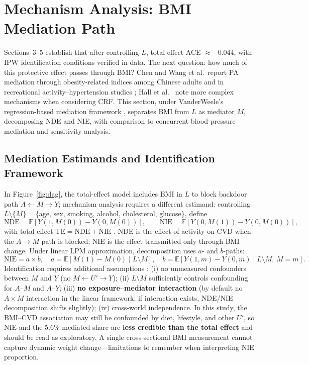 \documentclass[12pt,a4paper]{article}
\newcommand{\E}{\mathbb{E}}
\begin{document}
\section{Mechanism Analysis: BMI Mediation Path}

Sections~3--5 establish that after controlling $L$, total effect ACE $\approx -0.044$, with IPW identification conditions verified in data. The next question: how much of this protective effect passes through BMI? Chen and Wang et al.\ report PA mediation through obesity-related indices among Chinese adults and in recreational activity--hypertension studies \cite{chen2023pa,wang2023obesity}; Hall et al.\ \cite{bjsports2023crf} note more complex mechanisms when considering CRF. This section, under VanderWeele's regression-based mediation framework \cite{vanderweele2015explanation}, separates BMI from $L$ as mediator $M$, decomposing NDE and NIE, with comparison to concurrent blood pressure mediation and sensitivity analysis.

\subsection{Mediation Estimands and Identification Framework}

In Figure~\ref{fig:dag}, the total-effect model includes BMI in $L$ to block backdoor path $A\leftarrow M\to Y$; mechanism analysis requires a different estimand: controlling $L\setminus\{M\}=\{$age, sex, smoking, alcohol, cholesterol, glucose$\}$, define
\[
\mathrm{NDE}=\E[Y(1,M(0))-Y(0,M(0))],\qquad
\mathrm{NIE}=\E[Y(0,M(1))-Y(0,M(0))],
\]
with total effect $\mathrm{TE}=\mathrm{NDE}+\mathrm{NIE}$ \cite{vanderweele2015explanation}. NDE is the effect of activity on CVD when the $A\to M$ path is blocked; NIE is the effect transmitted only through BMI change. Under linear LPM approximation, decomposition uses $a$- and $b$-paths:
\[
\mathrm{NIE}=a\times b,\quad
a=\E[M(1)-M(0)\mid L\setminus M],\quad
b=\E[Y(1,m)-Y(0,m)\mid L\setminus M,\,M=m].
\]
Identification requires additional assumptions \cite{vanderweele2015explanation}: (i) no unmeasured confounders between $M$ and $Y$ (no $M\leftarrow U'\to Y$); (ii) $L\setminus M$ sufficiently controls confounding for $A$--$M$ and $A$--$Y$; (iii) \textbf{no exposure--mediator interaction} (by default no $A\times M$ interaction in the linear framework; if interaction exists, NDE/NIE decomposition shifts slightly); (iv) cross-world independence. In this study, the BMI--CVD association may still be confounded by diet, lifestyle, and other $U'$, so NIE and the 5.6\% mediated share are \textbf{less credible than the total effect} and should be read as exploratory. A single cross-sectional BMI measurement cannot capture dynamic weight change---limitations to remember when interpreting NIE proportion.
\end{document}
